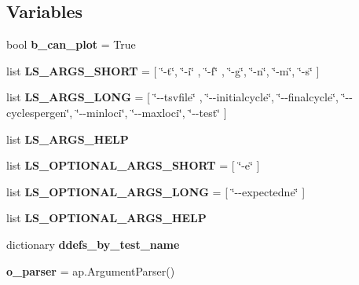 \subsection*{Variables}
\begin{DoxyCompactItemize}
\item 
bool {\bfseries b\+\_\+can\+\_\+plot} = True\hypertarget{namespacenegui_1_1pgvalidationtests_ab0c1159f0713697a25481675023fc667}{}\label{namespacenegui_1_1pgvalidationtests_ab0c1159f0713697a25481675023fc667}

\item 
list {\bfseries L\+S\+\_\+\+A\+R\+G\+S\+\_\+\+S\+H\+O\+RT} = \mbox{[} \char`\"{}-\/t\char`\"{}, \char`\"{}-\/i\char`\"{} , \char`\"{}-\/f\char`\"{} , \char`\"{}-\/g\char`\"{}, \char`\"{}-\/n\char`\"{}, \char`\"{}-\/m\char`\"{}, \char`\"{}-\/s\char`\"{} \mbox{]}\hypertarget{namespacenegui_1_1pgvalidationtests_a66c3e337805a10d83f2f0b462c720b6c}{}\label{namespacenegui_1_1pgvalidationtests_a66c3e337805a10d83f2f0b462c720b6c}

\item 
list {\bfseries L\+S\+\_\+\+A\+R\+G\+S\+\_\+\+L\+O\+NG} = \mbox{[} \char`\"{}-\/-\/tsvfile\char`\"{} , \char`\"{}-\/-\/initialcycle\char`\"{}, \char`\"{}-\/-\/finalcycle\char`\"{}, \char`\"{}-\/-\/cyclespergen\char`\"{}, \char`\"{}-\/-\/minloci\char`\"{}, \char`\"{}-\/-\/maxloci\char`\"{}, \char`\"{}-\/-\/test\char`\"{} \mbox{]}\hypertarget{namespacenegui_1_1pgvalidationtests_a1385b3581e58fda3e16c9b91905cfda3}{}\label{namespacenegui_1_1pgvalidationtests_a1385b3581e58fda3e16c9b91905cfda3}

\item 
list {\bfseries L\+S\+\_\+\+A\+R\+G\+S\+\_\+\+H\+E\+LP}
\item 
list {\bfseries L\+S\+\_\+\+O\+P\+T\+I\+O\+N\+A\+L\+\_\+\+A\+R\+G\+S\+\_\+\+S\+H\+O\+RT} = \mbox{[} \char`\"{}-\/e\char`\"{} \mbox{]}\hypertarget{namespacenegui_1_1pgvalidationtests_a7e351d7f60d7dcd3b8bc7714d63dd2e9}{}\label{namespacenegui_1_1pgvalidationtests_a7e351d7f60d7dcd3b8bc7714d63dd2e9}

\item 
list {\bfseries L\+S\+\_\+\+O\+P\+T\+I\+O\+N\+A\+L\+\_\+\+A\+R\+G\+S\+\_\+\+L\+O\+NG} = \mbox{[} \char`\"{}-\/-\/expectedne\char`\"{} \mbox{]}\hypertarget{namespacenegui_1_1pgvalidationtests_aa787bcaac3647fc826bbbab425b5305b}{}\label{namespacenegui_1_1pgvalidationtests_aa787bcaac3647fc826bbbab425b5305b}

\item 
list {\bfseries L\+S\+\_\+\+O\+P\+T\+I\+O\+N\+A\+L\+\_\+\+A\+R\+G\+S\+\_\+\+H\+E\+LP}
\item 
dictionary {\bfseries ddefs\+\_\+by\+\_\+test\+\_\+name}
\item 
{\bfseries o\+\_\+parser} = ap.\+Argument\+Parser()\hypertarget{namespacenegui_1_1pgvalidationtests_a50ef8ea2e3d1ce48dae1a52281b55225}{}\label{namespacenegui_1_1pgvalidationtests_a50ef8ea2e3d1ce48dae1a52281b55225}


\end{DoxyCompactItemize}
